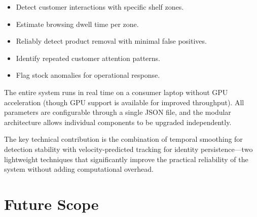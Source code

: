 \documentclass[12pt,a4paper]{article}
\begin{document}
\begin{itemize}[nosep]
    \item Detect customer interactions with specific shelf zones.
    \item Estimate browsing dwell time per zone.
    \item Reliably detect product removal with minimal false positives.
    \item Identify repeated customer attention patterns.
    \item Flag stock anomalies for operational response.
\end{itemize}

The entire system runs in real time on a consumer laptop without GPU acceleration (though GPU support is available for improved throughput).
All parameters are configurable through a single JSON file, and the modular architecture allows individual components to be upgraded independently.

The key technical contribution is the combination of temporal smoothing for detection stability with velocity-predicted tracking for identity persistence—two lightweight techniques that significantly improve the practical reliability of the system without adding computational overhead.

\section{Future Scope}
\end{document}
